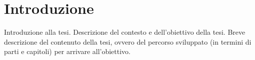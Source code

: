 



\chapter{Introduzione}
\label{ch:intro}

Introduzione alla tesi. 
%
Descrizione del contesto e dell'obiettivo della tesi.
%
Breve descrizione del contenuto della tesi, ovvero 
del percorso sviluppato (in termini di parti e capitoli) per arrivare all'obiettivo.
